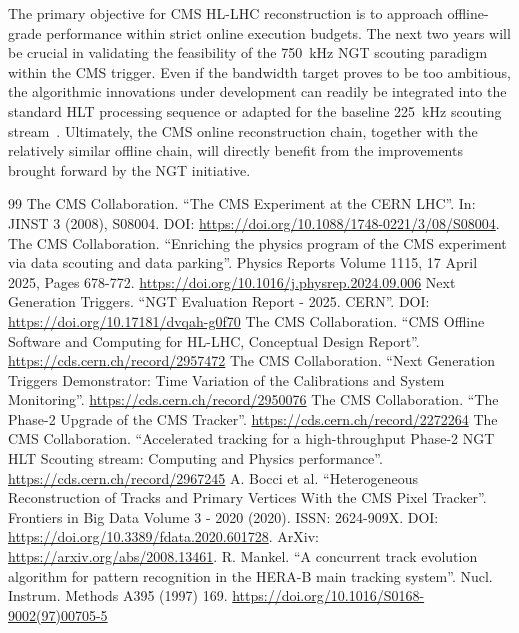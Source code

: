 \documentclass[a4paper,11pt]{article}
\begin{document}
The primary objective for CMS HL-LHC reconstruction is to approach offline-grade performance within strict online execution budgets.
The next two years will be crucial in validating the feasibility of the \SI{750}{\kilo\hertz} NGT scouting paradigm within the CMS trigger.
Even if the bandwidth target proves to be too ambitious, the algorithmic innovations under development can readily be integrated into the standard HLT processing sequence or adapted for the baseline \SI{225}{\kilo\hertz} scouting stream~\cite{octdr}.
Ultimately, the CMS online reconstruction chain, together with the relatively similar offline chain, will directly benefit from the improvements brought forward by the NGT initiative.

\begin{thebibliography}{99}
  The CMS Collaboration. ``The CMS Experiment at the CERN LHC''. In: JINST 3 (2008), S08004. DOI: \url{https://doi.org/10.1088/1748-0221/3/08/S08004}.
  The CMS Collaboration. ``Enriching the physics program of the CMS experiment via data scouting and data parking''. Physics Reports Volume 1115, 17 April 2025, Pages 678-772. \url{https://doi.org/10.1016/j.physrep.2024.09.006}
  Next Generation Triggers. ``NGT Evaluation Report - 2025. CERN''. DOI: \url{https://doi.org/10.17181/dvqah-g0f70}
  The CMS Collaboration. ``CMS Offline Software and Computing for HL-LHC, Conceptual Design Report''. \url{https://cds.cern.ch/record/2957472}  
  The CMS Collaboration. ``Next Generation Triggers Demonstrator: Time Variation of the Calibrations and System Monitoring''. \url{https://cds.cern.ch/record/2950076}
  The CMS Collaboration. ``The Phase-2 Upgrade of the CMS Tracker''. \url{https://cds.cern.ch/record/2272264}
  The CMS Collaboration. ``Accelerated tracking for a high-throughput Phase-2 NGT HLT Scouting stream: Computing and Physics performance''. \url{https://cds.cern.ch/record/2967245}
  A. Bocci et al. ``Heterogeneous Reconstruction of Tracks and Primary Vertices With the CMS Pixel Tracker''. Frontiers in Big Data Volume 3 - 2020 (2020). ISSN: 2624-909X. DOI: \url{https://doi.org/10.3389/fdata.2020.601728}. ArXiv: \url{https://arxiv.org/abs/2008.13461}.
  R. Mankel. ``A concurrent track evolution algorithm for pattern recognition in the HERA-B main tracking system''. Nucl. Instrum. Methods A395 (1997) 169. \url{https://doi.org/10.1016/S0168-9002(97)00705-5}
\end{thebibliography}
\end{document}
